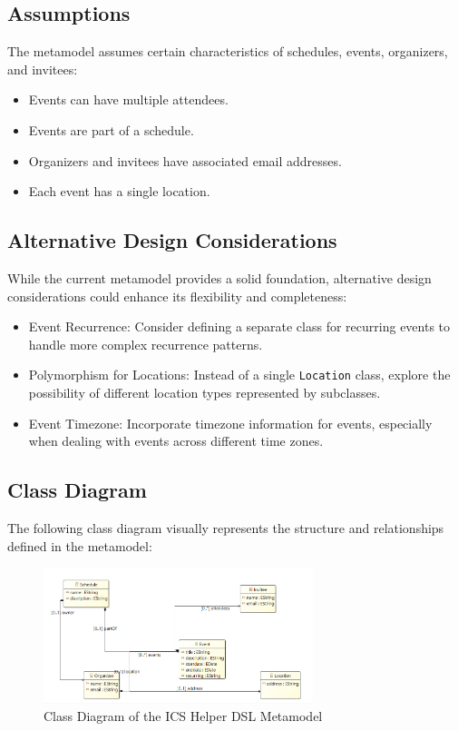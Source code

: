 \documentclass[12pt, letterpaper, twoside]{article}
\begin{document}
\subsection{Assumptions}

The metamodel assumes certain characteristics of schedules, events, organizers, and invitees:

\begin{itemize}
    \item Events can have multiple attendees.
    \item Events are part of a schedule.
    \item Organizers and invitees have associated email addresses.
    \item Each event has a single location.
\end{itemize}

\subsection{Alternative Design Considerations}

While the current metamodel provides a solid foundation, alternative design considerations could enhance its flexibility and completeness:

\begin{itemize}
    \item Event Recurrence: Consider defining a separate class for recurring events to handle more complex recurrence patterns.
    \item Polymorphism for Locations: Instead of a single \texttt{Location} class, explore the possibility of different location types represented by subclasses.
    \item Event Timezone: Incorporate timezone information for events, especially when dealing with events across different time zones.
\end{itemize}

\subsection{Class Diagram}

The following class diagram visually represents the structure and relationships defined in the metamodel:

\begin{figure}[H]
    \centering
    \includegraphics[width=0.7\textwidth]{class.png}
    \caption{Class Diagram of the ICS Helper DSL Metamodel}
    \label{fig:class-diagram}
\end{figure}
\end{document}
